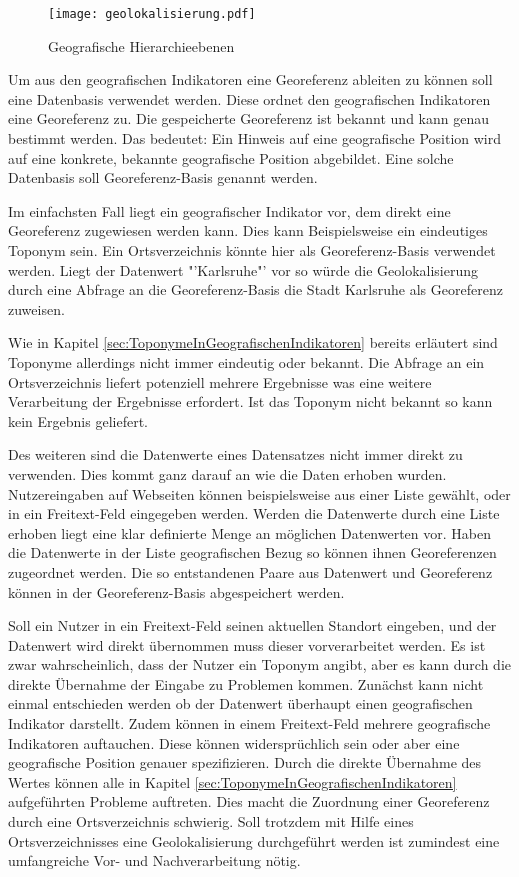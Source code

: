 		\begin{figure}[!ht]
		\begin{center}
		\texttt{[image: geolokalisierung.pdf]}
		\caption{Geografische Hierarchieebenen}
		\label{img:geolokalisierung}
		\end{center}
		\end{figure}	

		Um aus den geografischen Indikatoren eine Georeferenz ableiten zu können soll eine Datenbasis verwendet werden.
		Diese ordnet den geografischen Indikatoren eine Georeferenz zu.
		Die gespeicherte Georeferenz ist bekannt und kann genau bestimmt werden. 
		Das bedeutet: Ein Hinweis auf eine geografische Position wird auf eine konkrete, bekannte geografische Position abgebildet.
		Eine solche Datenbasis soll Georeferenz-Basis genannt werden.  

		Im einfachsten Fall liegt ein geografischer Indikator vor, dem direkt eine Georeferenz zugewiesen werden kann.
		Dies kann Beispielsweise ein eindeutiges Toponym sein.	
		Ein Ortsverzeichnis könnte hier als Georeferenz-Basis verwendet werden.
		Liegt der Datenwert "'Karlsruhe"' vor so würde die Geolokalisierung durch eine Abfrage an die Georeferenz-Basis die Stadt Karlsruhe als Georeferenz zuweisen.

		Wie in Kapitel \ref{sec:ToponymeInGeografischenIndikatoren} bereits erläutert sind Toponyme allerdings nicht immer eindeutig oder bekannt. 
		Die Abfrage an ein Ortsverzeichnis liefert potenziell mehrere Ergebnisse was eine weitere Verarbeitung der Ergebnisse erfordert.
		Ist das Toponym nicht bekannt so kann kein Ergebnis geliefert.

		Des weiteren sind die Datenwerte eines Datensatzes nicht immer direkt zu verwenden.
		Dies kommt ganz darauf an wie die Daten erhoben wurden. 
		Nutzereingaben auf Webseiten können beispielsweise aus einer Liste gewählt, oder in ein Freitext-Feld eingegeben werden.
		Werden die Datenwerte durch eine Liste erhoben liegt eine klar definierte Menge an möglichen Datenwerten vor.
		Haben die Datenwerte in der Liste geografischen Bezug so können ihnen Georeferenzen zugeordnet werden.
		Die so entstandenen Paare aus Datenwert und Georeferenz können in der Georeferenz-Basis abgespeichert werden.

		Soll ein Nutzer in ein Freitext-Feld seinen aktuellen Standort eingeben, und der Datenwert wird direkt übernommen muss dieser vorverarbeitet werden.
		Es ist zwar wahrscheinlich, dass der Nutzer ein Toponym angibt, aber es kann durch die direkte Übernahme der Eingabe zu Problemen kommen.
		Zunächst kann nicht einmal entschieden werden ob der Datenwert überhaupt einen geografischen Indikator darstellt.
		Zudem können in einem Freitext-Feld mehrere geografische Indikatoren auftauchen.
		Diese können widersprüchlich sein oder aber eine geografische Position genauer spezifizieren. 
		Durch die direkte Übernahme des Wertes können alle in Kapitel \ref{sec:ToponymeInGeografischenIndikatoren} aufgeführten Probleme auftreten.
		Dies macht die Zuordnung einer Georeferenz durch eine Ortsverzeichnis schwierig.
		Soll trotzdem mit Hilfe eines Ortsverzeichnisses eine Geolokalisierung durchgeführt werden ist zumindest eine umfangreiche Vor- und Nachverarbeitung nötig.

